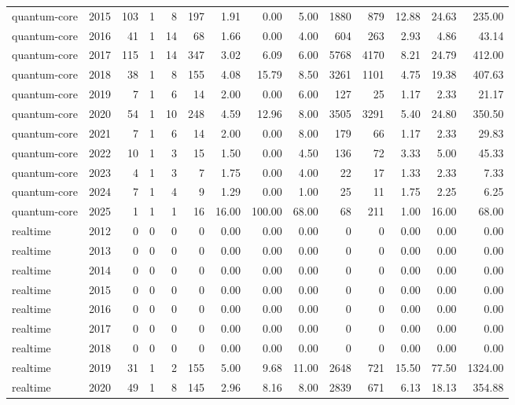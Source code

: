 \begin{table}[htbp]
\begin{tabular}{lrrrrrrrrrrrrr}
quantum-core & 2015 & 103 & 1 & 8 & 197 & 1.91 & 0.00 & 5.00 & 1880 & 879 & 12.88 & 24.63 & 235.00 \\
quantum-core & 2016 & 41 & 1 & 14 & 68 & 1.66 & 0.00 & 4.00 & 604 & 263 & 2.93 & 4.86 & 43.14 \\
quantum-core & 2017 & 115 & 1 & 14 & 347 & 3.02 & 6.09 & 6.00 & 5768 & 4170 & 8.21 & 24.79 & 412.00 \\
quantum-core & 2018 & 38 & 1 & 8 & 155 & 4.08 & 15.79 & 8.50 & 3261 & 1101 & 4.75 & 19.38 & 407.63 \\
quantum-core & 2019 & 7 & 1 & 6 & 14 & 2.00 & 0.00 & 6.00 & 127 & 25 & 1.17 & 2.33 & 21.17 \\
quantum-core & 2020 & 54 & 1 & 10 & 248 & 4.59 & 12.96 & 8.00 & 3505 & 3291 & 5.40 & 24.80 & 350.50 \\
quantum-core & 2021 & 7 & 1 & 6 & 14 & 2.00 & 0.00 & 8.00 & 179 & 66 & 1.17 & 2.33 & 29.83 \\
quantum-core & 2022 & 10 & 1 & 3 & 15 & 1.50 & 0.00 & 4.50 & 136 & 72 & 3.33 & 5.00 & 45.33 \\
quantum-core & 2023 & 4 & 1 & 3 & 7 & 1.75 & 0.00 & 4.00 & 22 & 17 & 1.33 & 2.33 & 7.33 \\
quantum-core & 2024 & 7 & 1 & 4 & 9 & 1.29 & 0.00 & 1.00 & 25 & 11 & 1.75 & 2.25 & 6.25 \\
quantum-core & 2025 & 1 & 1 & 1 & 16 & 16.00 & 100.00 & 68.00 & 68 & 211 & 1.00 & 16.00 & 68.00 \\
realtime & 2012 & 0 & 0 & 0 & 0 & 0.00 & 0.00 & 0.00 & 0 & 0 & 0.00 & 0.00 & 0.00 \\
realtime & 2013 & 0 & 0 & 0 & 0 & 0.00 & 0.00 & 0.00 & 0 & 0 & 0.00 & 0.00 & 0.00 \\
realtime & 2014 & 0 & 0 & 0 & 0 & 0.00 & 0.00 & 0.00 & 0 & 0 & 0.00 & 0.00 & 0.00 \\
realtime & 2015 & 0 & 0 & 0 & 0 & 0.00 & 0.00 & 0.00 & 0 & 0 & 0.00 & 0.00 & 0.00 \\
realtime & 2016 & 0 & 0 & 0 & 0 & 0.00 & 0.00 & 0.00 & 0 & 0 & 0.00 & 0.00 & 0.00 \\
realtime & 2017 & 0 & 0 & 0 & 0 & 0.00 & 0.00 & 0.00 & 0 & 0 & 0.00 & 0.00 & 0.00 \\
realtime & 2018 & 0 & 0 & 0 & 0 & 0.00 & 0.00 & 0.00 & 0 & 0 & 0.00 & 0.00 & 0.00 \\
realtime & 2019 & 31 & 1 & 2 & 155 & 5.00 & 9.68 & 11.00 & 2648 & 721 & 15.50 & 77.50 & 1324.00 \\
realtime & 2020 & 49 & 1 & 8 & 145 & 2.96 & 8.16 & 8.00 & 2839 & 671 & 6.13 & 18.13 & 354.88 \\

\end{tabular}
\end{table}
